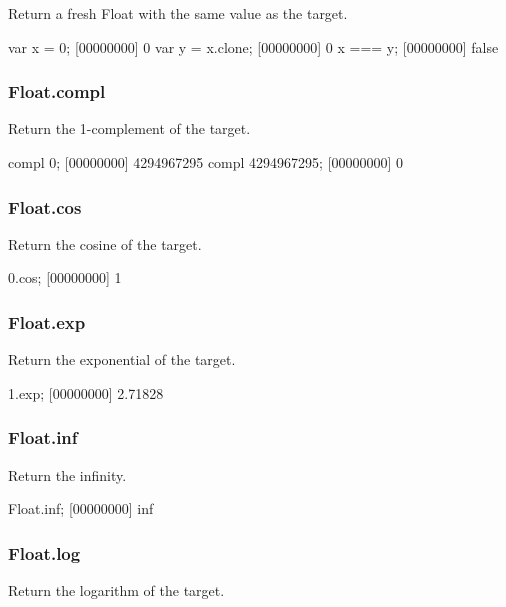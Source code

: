 Return a fresh Float with the same value as the target.

\begin{urbiscript}
var x = 0;
[00000000] 0
var y = x.clone;
[00000000] 0
x === y;
[00000000] false
\end{urbiscript}

\subsubsection{Float.compl}

Return the 1-complement of the target.

\begin{urbiscript}
compl 0;
[00000000] 4294967295
compl 4294967295;
[00000000] 0
\end{urbiscript}

\subsubsection{Float.cos}

Return the cosine of the target.

\begin{urbiscript}
0.cos;
[00000000] 1
\end{urbiscript}

\subsubsection{Float.exp}

Return the exponential of the target.

\begin{urbiscript}
1.exp;
[00000000] 2.71828
\end{urbiscript}

\subsubsection{Float.inf}

Return the infinity.

\begin{urbiscript}
Float.inf;
[00000000] inf
\end{urbiscript}

\subsubsection{Float.log}

Return the logarithm of the target.

